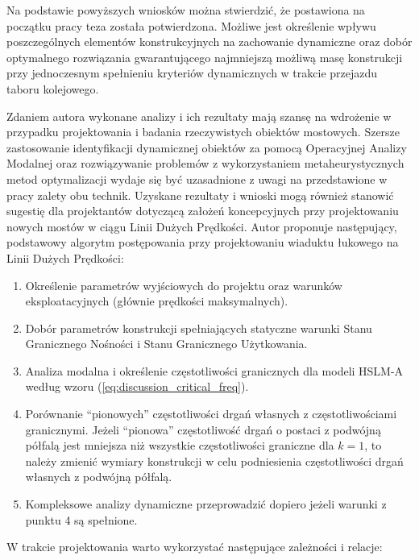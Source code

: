 Na podstawie powyższych wniosków można stwierdzić, że postawiona na początku pracy teza została potwierdzona. Możliwe jest określenie wpływu poszczególnych elementów konstrukcyjnych na zachowanie dynamiczne oraz dobór optymalnego rozwiązania gwarantującego najmniejszą możliwą masę konstrukcji przy jednoczesnym spełnieniu kryteriów dynamicznych w trakcie przejazdu taboru kolejowego.

Zdaniem autora wykonane analizy i ich rezultaty mają szansę na wdrożenie w przypadku projektowania i badania rzeczywistych obiektów mostowych. Szersze zastosowanie identyfikacji dynamicznej obiektów za pomocą Operacyjnej Analizy Modalnej oraz rozwiązywanie problemów z wykorzystaniem metaheurystycznych metod optymalizacji wydaje się być uzasadnione z uwagi na przedstawione w pracy zalety obu technik. Uzyskane rezultaty i wnioski mogą również stanowić sugestię dla projektantów dotyczącą założeń koncepcyjnych przy projektowaniu nowych mostów w ciągu Linii Dużych Prędkości. Autor proponuje następujący, podstawowy algorytm postępowania przy projektowaniu wiaduktu łukowego na Linii Dużych Prędkości:
\begin{enumerate}

\item Określenie parametrów wyjściowych do projektu oraz warunków eksploatacyjnych (głównie prędkości maksymalnych).

\item Dobór parametrów konstrukcji spełniających statyczne warunki Stanu Granicznego Nośności i Stanu Granicznego Użytkowania.

\item Analiza modalna i określenie częstotliwości granicznych dla modeli HSLM-A według wzoru (\ref{eq:discussion_critical_freq}).

\item Porównanie \enquote{pionowych} częstotliwości drgań własnych z częstotliwościami granicznymi. Jeżeli \enquote{pionowa} częstotliwość drgań o postaci z podwójną półfalą jest mniejsza niż wszystkie częstotliwości graniczne dla $k=1$, to należy zmienić wymiary konstrukcji w celu podniesienia częstotliwości drgań własnych z podwójną półfalą.

\item Kompleksowe analizy dynamiczne przeprowadzić dopiero jeżeli warunki z punktu 4 są spełnione.

\end{enumerate}
\noindent
W trakcie projektowania warto wykorzystać następujące zależności i relacje:
